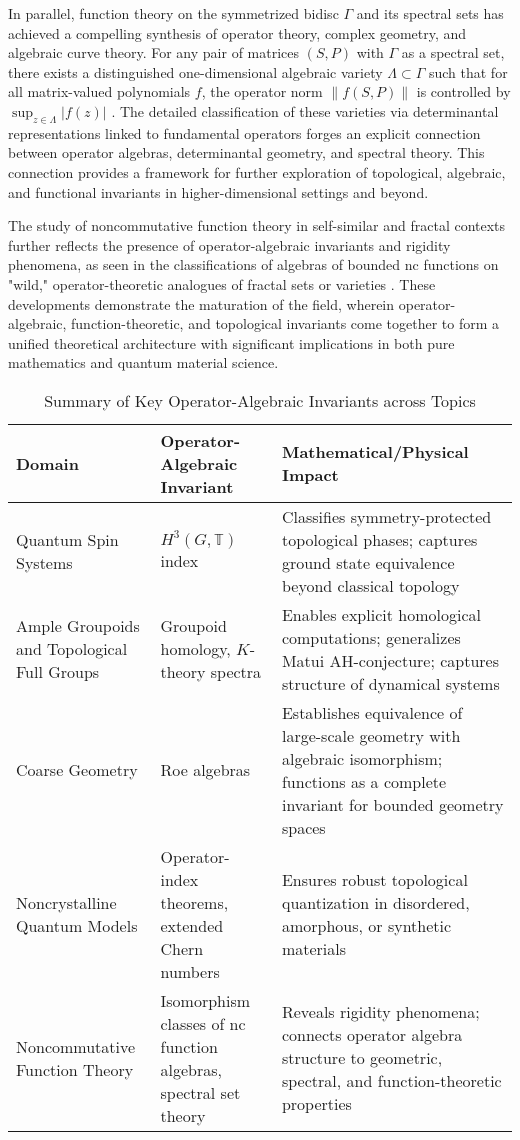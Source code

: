 \documentclass[11pt]{article}
\begin{document}
In parallel, function theory on the symmetrized bidisc $\Gamma$ and its spectral sets has achieved a compelling synthesis of operator theory, complex geometry, and algebraic curve theory. For any pair of matrices $(S, P)$ with $\Gamma$ as a spectral set, there exists a distinguished one-dimensional algebraic variety $\Lambda \subset \Gamma$ such that for all matrix-valued polynomials $f$, the operator norm $\|f(S,P)\|$ is controlled by $\sup_{z \in \Lambda} |f(z)|$ \cite{ref99}. The detailed classification of these varieties via determinantal representations linked to fundamental operators forges an explicit connection between operator algebras, determinantal geometry, and spectral theory. This connection provides a framework for further exploration of topological, algebraic, and functional invariants in higher-dimensional settings and beyond.

The study of noncommutative function theory in self-similar and fractal contexts further reflects the presence of operator-algebraic invariants and rigidity phenomena, as seen in the classifications of algebras of bounded nc functions on "wild," operator-theoretic analogues of fractal sets or varieties \cite{ref98,ref14}. These developments demonstrate the maturation of the field, wherein operator-algebraic, function-theoretic, and topological invariants come together to form a unified theoretical architecture with significant implications in both pure mathematics and quantum material science.

\begin{table}[ht]
\centering
\caption{Summary of Key Operator-Algebraic Invariants across Topics}
\label{tab:operator_invariants}
\begin{tabular}{|p{3cm}|p{5.5cm}|p{5.5cm}|}
\hline
\textbf{Domain} & \textbf{Operator-Algebraic Invariant} & \textbf{Mathematical/Physical Impact} \\
\hline
Quantum Spin Systems     & $H^3(G, \mathbb{T})$ index & Classifies symmetry-protected topological phases; captures ground state equivalence beyond classical topology \\
\hline
Ample Groupoids and Topological Full Groups & Groupoid homology, $K$-theory spectra & Enables explicit homological computations; generalizes Matui AH-conjecture; captures structure of dynamical systems \\
\hline
Coarse Geometry         & Roe algebras              & Establishes equivalence of large-scale geometry with algebraic isomorphism; functions as a complete invariant for bounded geometry spaces \\
\hline
Noncrystalline Quantum Models & Operator-index theorems, extended Chern numbers & Ensures robust topological quantization in disordered, amorphous, or synthetic materials \\
\hline
Noncommutative Function Theory & Isomorphism classes of nc function algebras, spectral set theory & Reveals rigidity phenomena; connects operator algebra structure to geometric, spectral, and function-theoretic properties \\
\hline
\end{tabular}
\end{table}
\end{document}
